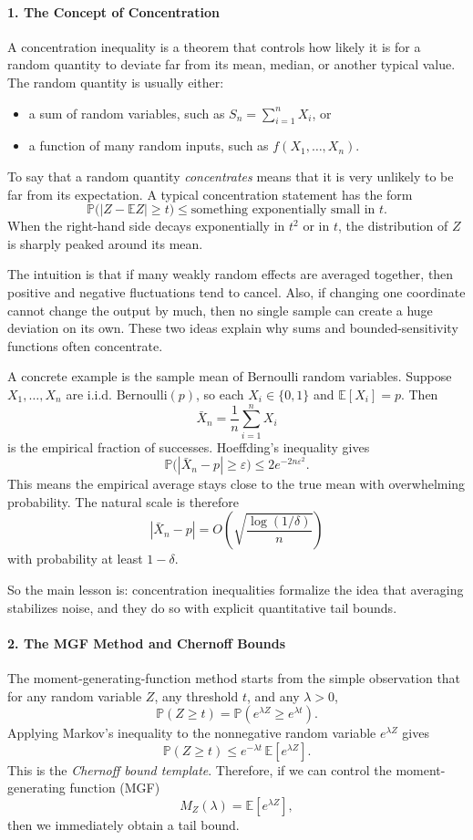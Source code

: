 \documentclass[11pt]{article}
\newcommand{\E}{\mathbb{E}}
\newcommand{\Pbb}{\mathbb{P}}
\newcommand{\eps}{\varepsilon}
\begin{document}
\begin{solutionbox}

\paragraph{1. The Concept of Concentration}
A concentration inequality is a theorem that controls how likely it is for a random quantity to deviate far from its mean, median, or another typical value. The random quantity is usually either:
\begin{itemize}[leftmargin=2em]
    \item a sum of random variables, such as $S_n=\sum_{i=1}^n X_i$, or
    \item a function of many random inputs, such as $f(X_1,\dots,X_n)$.
\end{itemize}

To say that a random quantity \emph{concentrates} means that it is very unlikely to be far from its expectation. A typical concentration statement has the form
\[
\Pbb\bigl(|Z-\E Z|\ge t\bigr) \le \text{something exponentially small in } t.
\]
When the right-hand side decays exponentially in $t^2$ or in $t$, the distribution of $Z$ is sharply peaked around its mean.

The intuition is that if many weakly random effects are averaged together, then positive and negative fluctuations tend to cancel. Also, if changing one coordinate cannot change the output by much, then no single sample can create a huge deviation on its own. These two ideas explain why sums and bounded-sensitivity functions often concentrate.

A concrete example is the sample mean of Bernoulli random variables. Suppose $X_1,\dots,X_n$ are i.i.d. Bernoulli$(p)$, so each $X_i\in\{0,1\}$ and $\E[X_i]=p$. Then
\[
\bar X_n = \frac1n\sum_{i=1}^n X_i
\]
is the empirical fraction of successes. Hoeffding's inequality gives
\[
\Pbb\bigl(|\bar X_n-p|\ge \eps\bigr) \le 2e^{-2n\eps^2}.
\]
This means the empirical average stays close to the true mean with overwhelming probability. The natural scale is therefore
\[
|\bar X_n-p| = O\!\left(\sqrt{\frac{\log(1/\delta)}{n}}\right)
\]
with probability at least $1-\delta$.

So the main lesson is: concentration inequalities formalize the idea that averaging stabilizes noise, and they do so with explicit quantitative tail bounds.
 \medskip
\paragraph{2. The MGF Method and Chernoff Bounds}
The moment-generating-function method starts from the simple observation that for any random variable $Z$, any threshold $t$, and any $\lambda>0$,
\[
\Pbb(Z\ge t)
=
\Pbb(e^{\lambda Z}\ge e^{\lambda t}).
\]
Applying Markov's inequality to the nonnegative random variable $e^{\lambda Z}$ gives
\[
\Pbb(Z\ge t)
\le e^{-\lambda t}\,\E[e^{\lambda Z}].
\]
This is the \emph{Chernoff bound template}. Therefore, if we can control the moment-generating function (MGF)
\[
M_Z(\lambda)=\E[e^{\lambda Z}],
\]
then we immediately obtain a tail bound.


\end{solutionbox}
\end{document}
